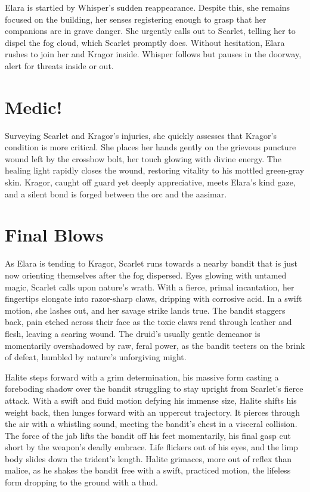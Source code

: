 \documentclass[
  letterpaper,12pt,twoside,twocolumn,openany,
  nodeprecatedcode,bg=full]{dndbook}
\begin{document}
Elara is startled by Whisper's sudden reappearance. Despite this, she
remains focused on the building, her senses registering enough to grasp
that her companions are in grave danger. She urgently calls out to
Scarlet, telling her to dispel the fog cloud, which Scarlet promptly
does. Without hesitation, Elara rushes to join her and Kragor inside.
Whisper follows but pauses in the doorway, alert for threats inside or
out.

\section{Medic!}\label{medic}

Surveying Scarlet and Kragor's injuries, she quickly assesses that
Kragor's condition is more critical. She places her hands gently on the
grievous puncture wound left by the crossbow bolt, her touch glowing
with divine energy. The healing light rapidly closes the wound,
restoring vitality to his mottled green-gray skin. Kragor, caught off
guard yet deeply appreciative, meets Elara's kind gaze, and a silent
bond is forged between the orc and the aasimar.

\section{Final Blows}\label{final-blows}

As Elara is tending to Kragor, Scarlet runs towards a nearby bandit that
is just now orienting themselves after the fog dispersed. Eyes glowing
with untamed magic, Scarlet calls upon nature's wrath. With a fierce,
primal incantation, her fingertips elongate into razor-sharp claws,
dripping with corrosive acid. In a swift motion, she lashes out, and her
savage strike lands true. The bandit staggers back, pain etched across
their face as the toxic claws rend through leather and flesh, leaving a
searing wound. The druid's usually gentle demeanor is momentarily
overshadowed by raw, feral power, as the bandit teeters on the brink of
defeat, humbled by nature's unforgiving might.

Halite steps forward with a grim determination, his massive form casting
a foreboding shadow over the bandit struggling to stay upright from
Scarlet's fierce attack. With a swift and fluid motion defying his
immense size, Halite shifts his weight back, then lunges forward with an
uppercut trajectory. It pierces through the air with a whistling sound,
meeting the bandit's chest in a visceral collision. The force of the jab
lifts the bandit off his feet momentarily, his final gasp cut short by
the weapon's deadly embrace. Life flickers out of his eyes, and the limp
body slides down the trident's length. Halite grimaces, more out of
reflex than malice, as he shakes the bandit free with a swift, practiced
motion, the lifeless form dropping to the ground with a thud.
\end{document}

